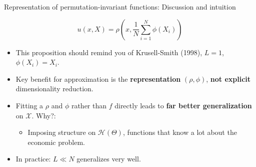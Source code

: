\documentclass[aspectratio=169,10pt]{beamer}
\newcommand{\emphcolor}[1]{\textbf{\textcolor{emphcolorval}{#1}}}
\newcommand{\Xdom}{\mathcal{X}}
\begin{document}
	\begin{frame}{Representation of permutation-invariant functions: Discussion and intuition}
		
		
		$$u(x,X) = \rho\left(x,\frac{1}{N} \sum_{i=1}^N\phi(X_i)\right)$$
			\begin{itemize}
				\item This proposition should remind you of Krusell-Smith (1998), $L =1$, $\phi(X_i) = X_i$. \vspace{0.1 in}
				\item Key benefit for approximation is the \emphcolor{representation} $(\rho,\phi)$,\vspace{0.1 in} \emphcolor{not explicit} dimensionality reduction.
				\smallskip
				\item Fitting a $\rho$ and $\phi$ rather than $f$ directly leads to \emphcolor{far better generalization} on $\Xdom$. Why?:\vspace{0.1 in}
				\smallskip
				\begin{itemize}
					\item Imposing structure on $\mathcal{H}(\Theta)$, functions that know a lot about the economic problem.\vspace{0.1 in}
				\end{itemize}
				\item In practice: $L\ll N$  generalizes very well.
			\end{itemize}
	\end{frame}
\end{document}

